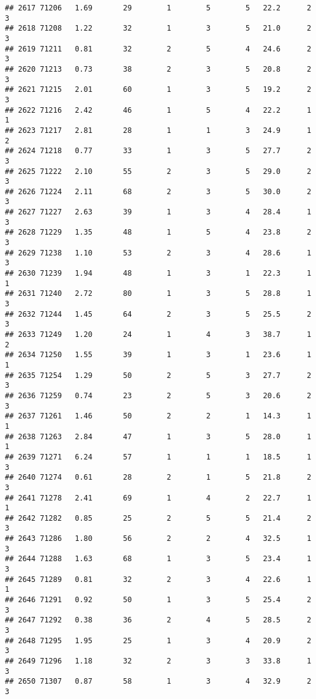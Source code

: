 \documentclass[
]{article}
\begin{document}
\begin{verbatim}
## 2617 71206   1.69       29        1        5        5   22.2      2      3
## 2618 71208   1.22       32        1        3        5   21.0      2      3
## 2619 71211   0.81       32        2        5        4   24.6      2      3
## 2620 71213   0.73       38        2        3        5   20.8      2      3
## 2621 71215   2.01       60        1        3        5   19.2      2      3
## 2622 71216   2.42       46        1        5        4   22.2      1      1
## 2623 71217   2.81       28        1        1        3   24.9      1      2
## 2624 71218   0.77       33        1        3        5   27.7      2      3
## 2625 71222   2.10       55        2        3        5   29.0      2      3
## 2626 71224   2.11       68        2        3        5   30.0      2      3
## 2627 71227   2.63       39        1        3        4   28.4      1      3
## 2628 71229   1.35       48        1        5        4   23.8      2      3
## 2629 71238   1.10       53        2        3        4   28.6      1      3
## 2630 71239   1.94       48        1        3        1   22.3      1      1
## 2631 71240   2.72       80        1        3        5   28.8      1      3
## 2632 71244   1.45       64        2        3        5   25.5      2      3
## 2633 71249   1.20       24        1        4        3   38.7      1      2
## 2634 71250   1.55       39        1        3        1   23.6      1      1
## 2635 71254   1.29       50        2        5        3   27.7      2      3
## 2636 71259   0.74       23        2        5        3   20.6      2      3
## 2637 71261   1.46       50        2        2        1   14.3      1      1
## 2638 71263   2.84       47        1        3        5   28.0      1      1
## 2639 71271   6.24       57        1        1        1   18.5      1      3
## 2640 71274   0.61       28        2        1        5   21.8      2      3
## 2641 71278   2.41       69        1        4        2   22.7      1      1
## 2642 71282   0.85       25        2        5        5   21.4      2      3
## 2643 71286   1.80       56        2        2        4   32.5      1      3
## 2644 71288   1.63       68        1        3        5   23.4      1      3
## 2645 71289   0.81       32        2        3        4   22.6      1      1
## 2646 71291   0.92       50        1        3        5   25.4      2      3
## 2647 71292   0.38       36        2        4        5   28.5      2      3
## 2648 71295   1.95       25        1        3        4   20.9      2      3
## 2649 71296   1.18       32        2        3        3   33.8      1      3
## 2650 71307   0.87       58        1        3        4   32.9      2      3

\end{verbatim}
\end{document}
